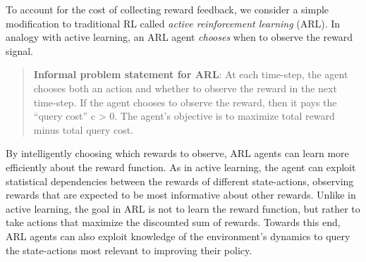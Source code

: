 \documentclass{article}
\begin{document}
To account for the cost of collecting reward feedback, we consider a simple modification to traditional RL called \emph{active reinforcement learning} (ARL).
In analogy with active learning, an ARL agent {\em chooses} when to observe the reward signal. 
\begin{quote}
 \textbf{Informal problem statement for ARL}: \newline
At each time-step, the agent chooses both an action and whether to observe the reward in the next time-step. 
If the agent chooses to observe the reward, then it pays the ``query cost'' c > 0.
The agent's objective is to maximize total reward minus total query cost.
\end{quote}
%



By intelligently choosing which rewards to observe, ARL agents can learn more efficiently about the reward function. 
As in active learning, the agent can exploit statistical dependencies between the rewards of different state-actions, observing rewards that are expected to be most informative about other rewards. 
Unlike in active learning, the goal in ARL is not to learn the reward function, but rather to take actions that maximize the discounted sum of rewards. %
Towards this end, ARL agents can also exploit knowledge of the environment's dynamics to query the state-actions most relevant to improving their policy.  
\end{document}
